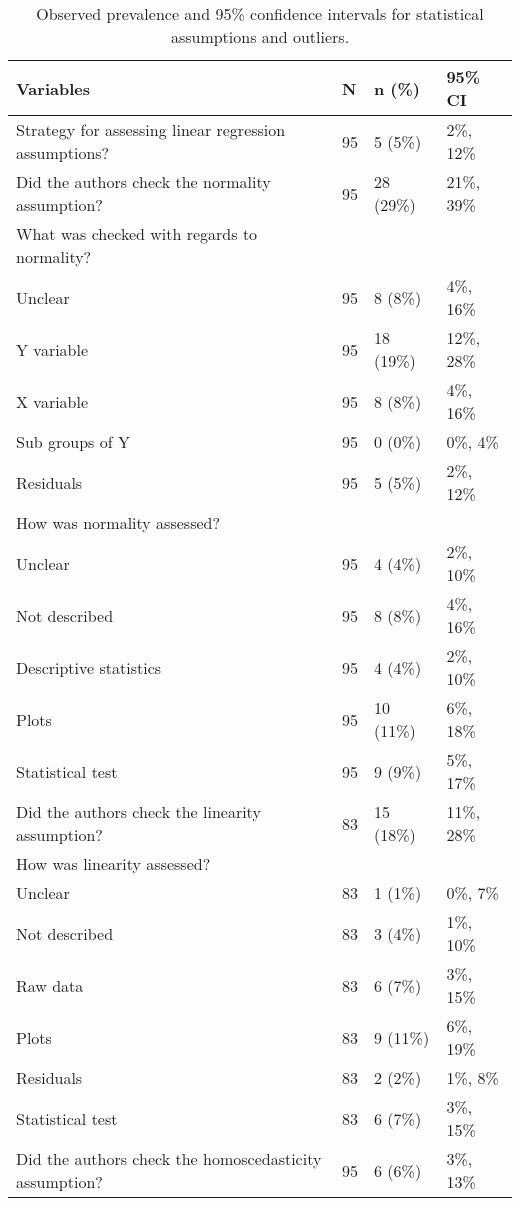 \begin{table}[H]
\begin{widestuff}
\caption{Observed prevalence and 95\%  confidence intervals for statistical
             assumptions and outliers.} 
\begin{flushleft}  \begin{tabular}{p{9cm}lll} 
  \toprule
{\bf Variables} & {\bf N} & {\bf n (\%) } & {\bf 95\% CI} \\ 
  \midrule
Strategy for assessing linear regression assumptions? & 95 & 5 (5\%) & 2\%, 12\% \\ 
  Did the authors check the normality assumption? & 95 & 28 (29\%) & 21\%, 39\% \\ 
  What was checked with regards to normality? &  &  &  \\ 
  Unclear & 95 & 8 (8\%) & 4\%, 16\% \\ 
  Y variable & 95 & 18 (19\%) & 12\%, 28\% \\ 
  X variable & 95 & 8 (8\%) & 4\%, 16\% \\ 
  Sub groups of Y & 95 & 0 (0\%) & 0\%, 4\% \\ 
  Residuals & 95 & 5 (5\%) & 2\%, 12\% \\ 
  How was normality assessed? &  &  &  \\ 
  Unclear & 95 & 4 (4\%) & 2\%, 10\% \\ 
  Not described & 95 & 8 (8\%) & 4\%, 16\% \\ 
  Descriptive statistics & 95 & 4 (4\%) & 2\%, 10\% \\ 
  Plots & 95 & 10 (11\%) & 6\%, 18\% \\ 
  Statistical test & 95 & 9 (9\%) & 5\%, 17\% \\ 
  Did the authors check the linearity assumption? & 83 & 15 (18\%) & 11\%, 28\% \\ 
  How was linearity assessed? &  &  &  \\ 
  Unclear & 83 & 1 (1\%) & 0\%, 7\% \\ 
  Not described & 83 & 3 (4\%) & 1\%, 10\% \\ 
  Raw data & 83 & 6 (7\%) & 3\%, 15\% \\ 
  Plots & 83 & 9 (11\%) & 6\%, 19\% \\ 
  Residuals & 83 & 2 (2\%) & 1\%, 8\% \\ 
  Statistical test & 83 & 6 (7\%) & 3\%, 15\% \\ 
  Did the authors check the homoscedasticity assumption? & 95 & 6 (6\%) & 3\%, 13\% \\ 

\end{tabular}
\end{flushleft}
\end{widestuff}
\end{table}
